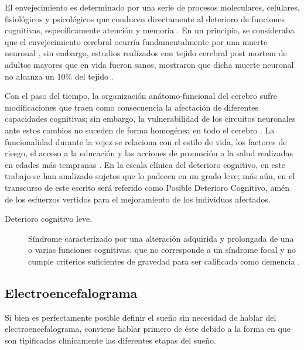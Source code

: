 \documentclass[12pt,a4paper]{mitthesis}
\begin{document}
El envejecimiento es determinado por una serie de procesos moleculares, celulares, fisiol\'ogicos y 
psicol\'ogicos que conducen directamente al deterioro de funciones cognitivas, específicamente 
atenci\'on y memoria \cite{Navarrete03,Park09}. 
En un principio, se consideraba que el envejecimiento cerebral ocurr\'ia fundamentalmente por una 
muerte neuronal \cite{Coleman87}, sin embargo, estudios realizados con tejido cerebral post mortem 
de adultos mayores que en vida fueron sanos, mostraron que dicha muerte neuronal no alcanza un 10\% 
del tejido \cite{Esiri07}. 

Con el paso del tiempo, la organizaci\'on an\'atomo-funcional del cerebro sufre modificaciones que 
traen como consecuencia la afectaci\'on de diferentes capacidades cognitivas; sin embargo, la 
vulnerabilidad de los circuitos neuronales ante estos cambios no suceden de forma homog\'enea en 
todo el cerebro \cite{Hita14}.
La funcionalidad durante la vejez se relaciona con el estilo de vida, los factores de riesgo, el 
acceso a la educaci\'on y las acciones de promoci\'on a la salud realizadas en edades m\'as 
tempranas \cite{Ohayon04,Sanhueza14}.
En la escala cl\'inica del deterioro cognitivo, en este trabajo se han analizado sujetos que lo
padecen en un grado leve; m\'as a\'un, en el transcurso de este escrito ser\'a referido como 
Posible Deterioro Cognitivo, am\'en de los esfuerzos vertidos para el mejoramiento de los 
individuos afectados.

\begin{description}
\item[Deterioro cognitivo leve.] S\'indrome caracterizado por una alteraci\'on adquirida y 
prolongada de una o varias funciones cognitivas, que no corresponde a un s\'indrome focal y no 
cumple criterios suficientes de gravedad para ser calificada como demencia \cite{Robles02}.
\end{description}


\subsection{Electroencefalograma}

Si bien es perfectamente posible definir el sue\~no sin necesidad de hablar del 
electroencefalograma, conviene hablar primero de \'este debido a la forma en que son tipificadas
cl\'inicamente las diferentes etapas del sue\~no.
\end{document}
